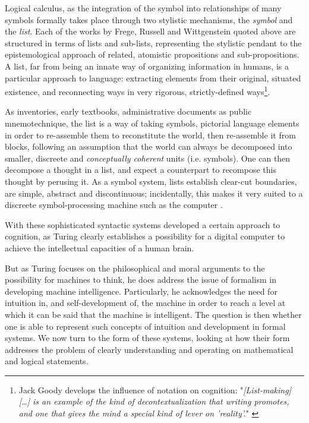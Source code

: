 Logical calculus, as the integration of the symbol into relationships of many symbols formally takes place through two stylistic mechanisms, the \emph{symbol} and the \emph{list}. Each of the works by Frege, Russell and Wittgenstein quoted above are structured in terms of lists and sub-lists, representing the stylistic pendant to the epistemological approach of related, atomistic propositions and sub-propositions. A list, far from being an innate way of organizing information in humans, is a particular approach to language: extracting elements from their original, situated existence, and reconnecting ways in very rigorous, strictly-defined ways\footnote{Jack Goody develops the influence of notation on cognition: "\emph{[List-making] [\dots] is an example of the kind of decontextualization that writing promotes, and one that gives the mind a special kind of lever on 'reality'.}" \citep{goody_domestication_1977}}.

As inventories, early textbooks, administrative documents as public mnemotechnique, the list is a way of taking symbols, pictorial language elements in order to re-assemble them to reconstitute the world, then re-assemble it from blocks, following an assumption that the world can always be decomposed into smaller, discreete and \emph{conceptually coherent} units (i.e. symbols). One can then decompose a thought in a list, and expect a counterpart to recompose this thought by perusing it. As a symbol system, lists establish clear-cut boundaries, are simple, abstract and discontinuous; incidentally, this makes it very suited to a discreete symbol-processing machine such as the computer \citep{depaz_stylistique_2023}.

With these sophisticated syntactic systems developed a certain approach to cognition, as Turing clearly establishes a possibility for a digital computer to achieve the intellectual capacities of a human brain.

But as Turing focuses on the philosophical and moral arguments to the possibility for machines to think, he does address the issue of formalism in developing machine intelligence. Particularly, he acknowledges the need for intuition in, and self-development of, the machine in order to reach a level at which it can be said that the machine is intelligent. The question is then whether one is able to represent such concepts of intuition and development in formal systems. We now turn to the form of these systems, looking at how their form addresses the problem of clearly understanding and operating on mathematical and logical statements.


